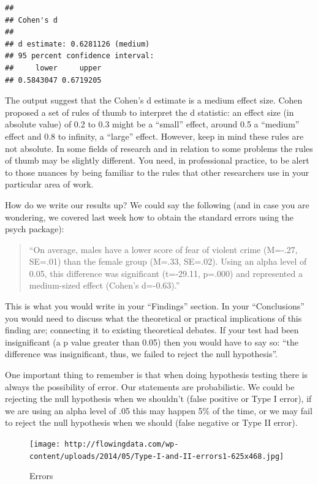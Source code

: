 \documentclass[
]{book}
\begin{document}
\begin{verbatim}
## 
## Cohen's d
## 
## d estimate: 0.6281126 (medium)
## 95 percent confidence interval:
##     lower     upper 
## 0.5843047 0.6719205
\end{verbatim}

The output suggest that the Cohen's d estimate is a medium effect size. Cohen proposed a set of rules of thumb to interpret the d statistic: an effect size (in absolute value) of 0.2 to 0.3 might be a ``small'' effect, around 0.5 a ``medium'' effect and 0.8 to infinity, a ``large'' effect. However, keep in mind these rules are not absolute. In some fields of research and in relation to some problems the rules of thumb may be slightly different. You need, in professional practice, to be alert to those nuances by being familiar to the rules that other researchers use in your particular area of work.

How do we write our results up? We could say the following (and in case you are wondering, we covered last week how to obtain the standard errors using the psych package):

\begin{quote}
``On average, males have a lower score of fear of violent crime (M=-.27, SE=.01) than the female group (M=.33, SE=.02). Using an alpha level of 0.05, this difference was significant (t=-29.11, p=.000) and represented a medium-sized effect (Cohen's d=-0.63).''
\end{quote}

This is what you would write in your ``Findings'' section. In your ``Conclusions'' you would need to discuss what the theoretical or practical implications of this finding are; connecting it to existing theoretical debates. If your test had been insignificant (a p value greater than 0.05) then you would have to say so: ``the difference was insignificant, thus, we failed to reject the null hypothesis''.

One important thing to remember is that when doing hypothesis testing there is always the possibility of error. Our statements are probabilistic. We could be rejecting the null hypothesis when we shouldn't (false positive or Type I error), if we are using an alpha level of .05 this may happen 5\% of the time, or we may fail to reject the null hypothesis when we should (false negative or Type II error).

\begin{figure}
\centering
\texttt{[image: http://flowingdata.com/wp-content/uploads/2014/05/Type-I-and-II-errors1-625x468.jpg]}
\caption{Errors}
\end{figure}
\end{document}
